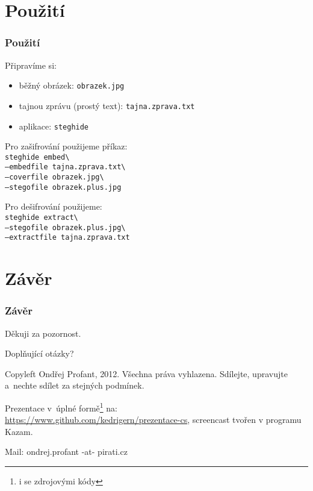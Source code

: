 \documentclass[xetex]{beamer}
\begin{document}
\section{Použití}
\begin{frame}
	\frametitle{Použití}
	Připravíme si:
	\begin{itemize}
		\item běžný obrázek: \texttt{obrazek.jpg}
		\item tajnou zprávu (prostý text): \texttt{tajna.zprava.txt}
		\item aplikace: \texttt{steghide}
	\end{itemize}	

Pro zašifrování použijeme příkaz:\\
\texttt{steghide embed\textbackslash{} \\ --embedfile tajna.zprava.txt\textbackslash{} \\ --coverfile obrazek.jpg\textbackslash{} \\ --stegofile obrazek.plus.jpg}

Pro dešifrování použijeme:\\
\texttt{steghide extract\textbackslash{} \\ --stegofile obrazek.plus.jpg\textbackslash{}\\ --extractfile tajna.zprava.txt}
\end{frame}

\section{Závěr}

\begin{frame}
  \frametitle{Závěr}
	Děkuji za pozornost.

	\bigskip
	
	Doplňující otázky?

	\bigskip

	\bigskip

	\scriptsize
	Copyleft Ondřej Profant, 2012. Všechna práva vyhlazena. Sdílejte, upravujte a~nechte sdílet za stejných podmínek. 

	\bigskip

	Prezentace v~úplné formě\footnote{i se zdrojovými kódy} na:\\ 
	\url{https://www.github.com/kedrigern/prezentace-cs}, screencast tvořen v programu Kazam.

	\bigskip

	Mail: ondrej.profant -at- pirati.cz 
\end{frame}
\end{document}
